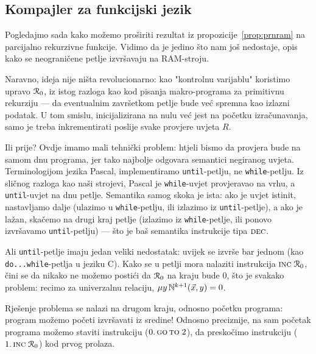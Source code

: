 \subsection{Kompajler za funkcijski jezik}\label{sec:pir}

Pogledajmo sada kako možemo proširiti rezultat iz propozicije~\ref{prop:prnram} na parcijalno rekurzivne funkcije. Vidimo da je jedino što nam još nedostaje, opis kako se neograničene petlje izvršavaju na RAM-stroju.

Naravno, ideja nije ništa revolucionarno: kao "kontrolnu varijablu" koristimo upravo $\mathcal R_{0}$, iz istog razloga kao kod pisanja makro-programa za primitivnu rekurziju --- da eventualnim završetkom petlje bude već spremna kao izlazni podatak. U tom smislu, inicijalizirana na nulu već jest na početku izračunavanja, samo je treba inkrementirati poslije svake provjere uvjeta $R$.

Ili prije? Ovdje imamo mali tehnički problem: htjeli bismo da provjera bude na samom dnu programa, jer tako najbolje odgovara semantici negiranog uvjeta. Terminologijom jezika Pascal, implementiramo \texttt{until}-petlju, ne \texttt{while}-petlju. Iz sličnog razloga kao naši strojevi, Pascal je \texttt{while}-uvjet provjeravao na vrhu, a \texttt{until}-uvjet na dnu petlje. Semantika samog skoka je ista: ako je uvjet istinit, nastavljamo dalje (ulazimo u \texttt{while}-petlju, ili izlazimo iz \texttt{until}-petlje), a ako je lažan, skačemo na drugi kraj petlje (izlazimo iz \texttt{while}-petlje, ili ponovo izvršavamo \texttt{until}-petlju) --- što je baš semantika instrukcije tipa $\textsc{dec}$.

Ali \texttt{until}-petlje imaju jedan veliki nedostatak: uvijek se izvrše bar jednom (kao \texttt{do...while}-petlja u jeziku C). Kako se u petlji mora nalaziti instrukcija $\textsc{inc}\;\mathcal R_{0}$, čini se da nikako ne možemo postići da $\mathcal R_{0}$ na kraju bude $0$, što je svakako problem: recimo za univerzalnu relaciju, $\mu y\,{\mathbb N}^{k+1}(\vec x,y)=0$.

Rješenje problema se nalazi na drugom kraju, odnosno početku programa: program možemo početi izvršavati iz sredine! Odnosno preciznije, na sam početak programa možemo staviti instrukciju ($0.\,\textsc{go\,to}\;2$), da preskočimo instrukciju ($1.\,\textsc{inc}\;\mathcal R_{0}$) kod prvog prolaza.

